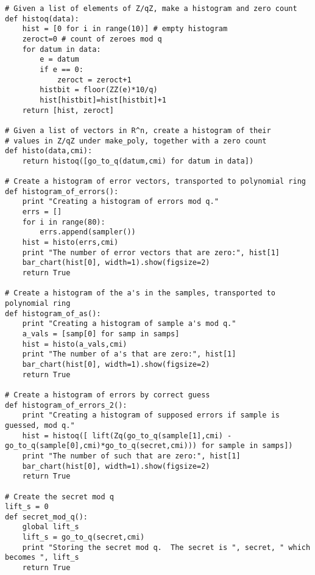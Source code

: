 \documentclass{llncs}
\newcommand{\<}{\langle}
\renewcommand{\>}{\rangle}
\begin{document}
\begin{verbatim}
# Given a list of elements of Z/qZ, make a histogram and zero count
def histoq(data):
    hist = [0 for i in range(10)] # empty histogram
    zeroct=0 # count of zeroes mod q
    for datum in data:
        e = datum
        if e == 0:
            zeroct = zeroct+1
        histbit = floor(ZZ(e)*10/q)
        hist[histbit]=hist[histbit]+1
    return [hist, zeroct]

# Given a list of vectors in R^n, create a histogram of their
# values in Z/qZ under make_poly, together with a zero count
def histo(data,cmi):
    return histoq([go_to_q(datum,cmi) for datum in data])

# Create a histogram of error vectors, transported to polynomial ring
def histogram_of_errors():
    print "Creating a histogram of errors mod q."
    errs = []
    for i in range(80):
        errs.append(sampler())
    hist = histo(errs,cmi)
    print "The number of error vectors that are zero:", hist[1]
    bar_chart(hist[0], width=1).show(figsize=2)
    return True

# Create a histogram of the a's in the samples, transported to polynomial ring
def histogram_of_as():
    print "Creating a histogram of sample a's mod q."
    a_vals = [samp[0] for samp in samps]
    hist = histo(a_vals,cmi)
    print "The number of a's that are zero:", hist[1]
    bar_chart(hist[0], width=1).show(figsize=2)
    return True

# Create a histogram of errors by correct guess
def histogram_of_errors_2():
    print "Creating a histogram of supposed errors if sample is guessed, mod q."
    hist = histoq([ lift(Zq(go_to_q(sample[1],cmi) - go_to_q(sample[0],cmi)*go_to_q(secret,cmi))) for sample in samps])
    print "The number of such that are zero:", hist[1]
    bar_chart(hist[0], width=1).show(figsize=2)
    return True

# Create the secret mod q
lift_s = 0
def secret_mod_q():
    global lift_s
    lift_s = go_to_q(secret,cmi)
    print "Storing the secret mod q.  The secret is ", secret, " which becomes ", lift_s
    return True


\end{verbatim}
\end{document}
